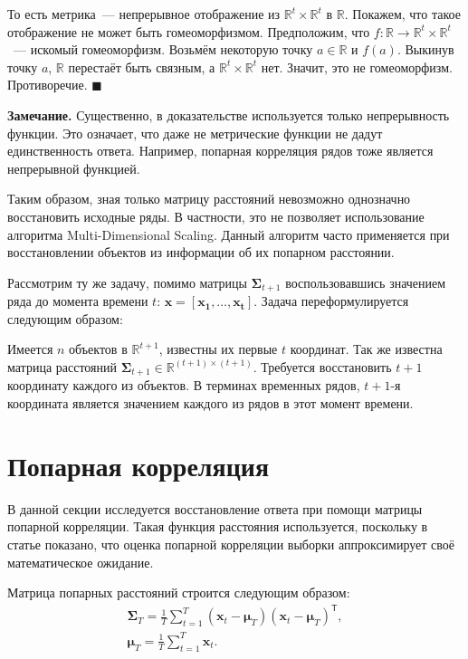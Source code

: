 \documentclass{article}
\begin{document}
То есть метрика~--- непрерывное отображение из $\mathbb{R}^t \times \mathbb{R}^t$ в $\mathbb{R}$. Покажем, что такое отображение не может быть гомеоморфизмом. Предположим, что $f: \mathbb{R} \to \mathbb{R}^t \times \mathbb{R}^t$~--- искомый гомеоморфизм. Возьмём некоторую точку $a \in \mathbb{R}$ и $f(a)$. Выкинув точку $a$, $\mathbb{R}$ перестаёт быть связным, а $\mathbb{R}^t \times \mathbb{R}^t$ нет. Значит, это не гомеоморфизм. Противоречие.
$\blacksquare$

\textbf{Замечание.} Существенно, в доказательстве используется только непрерывность функции. Это означает, что даже не метрические функции не дадут единственность ответа. Например, попарная корреляция рядов тоже является непрерывной функцией.

Таким образом, зная только матрицу расстояний невозможно однозначно восстановить исходные ряды. В частности, это не позволяет использование алгоритма Multi-Dimensional Scaling. Данный алгоритм часто применяется при восстановлении объектов из информации об их попарном расстоянии.

Рассмотрим ту же задачу, помимо матрицы $\mathbf{\Sigma}_{t+1}$ воспользовавшись значением ряда до момента времени $t$: $\mathbf{x}=[\mathbf{x_1}, \ldots, \mathbf{x_{t}}]$. Задача переформулируется следующим образом:

Имеется $n$ объектов в $\mathbb{R}^{t+1}$, известны их первые $t$ координат. Так же известна матрица расстояний $\mathbf{\Sigma}_{t+1} \in \mathbb{R}^{(t+1) \times (t+1)}$. Требуется восстановить $t+1$ координату каждого из объектов. В терминах временных рядов, $t+1$-я координата является значением каждого из рядов в этот момент времени.

\section{Попарная корреляция}

В данной секции исследуется восстановление ответа при помощи матрицы попарной корреляции. Такая функция расстояния используется, поскольку в статье \cite{puchkin2023sharper} показано, что оценка попарной корреляции выборки аппроксимирует своё математическое ожидание.

Матрица попарных расстояний строится следующим образом:
\begin{gather*}
	{\mathbf{\Sigma}}_T = \frac{1}{T} \sum_{t=1}^{T} (\mathbf{x}_t - \boldsymbol{\mu}_T)(\mathbf{x}_t - \boldsymbol{\mu}_T)^\mathsf{T},\\
	\boldsymbol{\mu}_T = \frac{1}{T} \sum_{t=1}^{T} \mathbf{x}_t.
\end{gather*}
\end{document}
